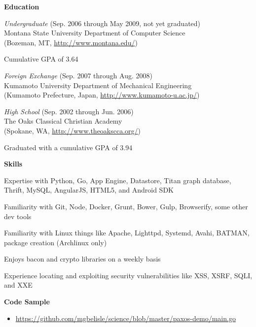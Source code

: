 \documentclass[10pt, a4paper]{article}
\begin{document}
\textbf{Education}
\begin{itemize*}
  \item \emph{Undergraduate} (Sep. 2006 through May 2009, not yet graduated)\\
    Montana State University Department of Computer Science\\
    (Bozeman, MT, \url{http://www.montana.edu/})
    \begin{itemize*}
      \item Cumulative GPA of 3.64
    \end{itemize*}
  \item \emph{Foreign Exchange} (Sep. 2007 through Aug. 2008) \\ Kumamoto University Department of Mechanical Engineering \\(Kumamoto Prefecture, Japan, \url{http://www.kumamoto-u.ac.jp/})
  \item \emph{High School} (Sep. 2002 through Jun. 2006)\\
    The Oaks Classical Christian Academy\\
    (Spokane, WA, \url{http://www.theoakscca.org/})
    \begin{itemize*}
      \item Graduated with a cumulative GPA of 3.94
    \end{itemize*}
\end{itemize*}
\textbf{Skills}
\begin{itemize*}
  \item Expertise with Python, Go, App Engine, Datastore, Titan graph database, Thrift, MySQL, AngularJS, HTML5, and Android SDK
  \item Familiarity with Git, Node, Docker, Grunt, Bower, Gulp, Browserify, some other dev tools
  \item Familiarity with Linux things like Apache, Lighttpd, Systemd, Avahi, BATMAN, package creation (Archlinux only)
  \item Enjoys bacon and crypto libraries on a weekly basis
  \item Experience locating and exploiting security vulnerabilities like XSS, XSRF, SQLI, and XXE
\end{itemize*}
\textbf{Code Sample}
\begin{itemize}
  \item[] \url{https://github.com/mgbelisle/science/blob/master/paxos-demo/main.go}
\end{itemize}
\end{document}
